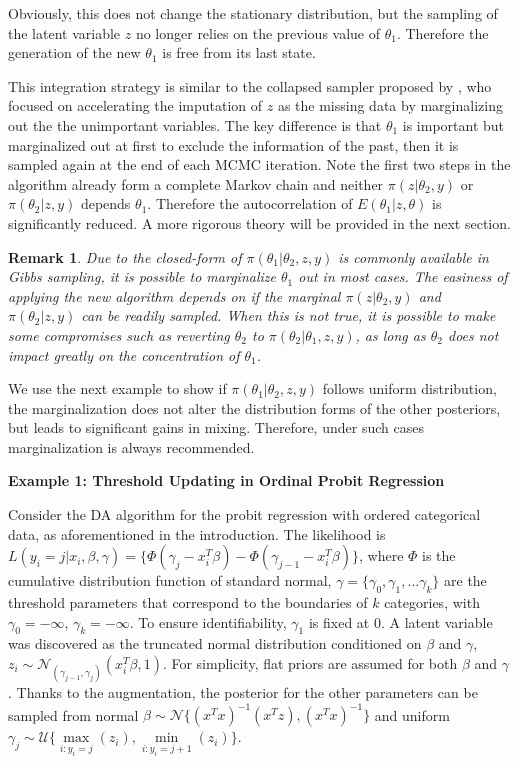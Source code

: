 \documentclass[10pt]{article}
\newtheorem{remark}{Remark}
\begin{document}
Obviously, this does not change the stationary distribution, but the sampling of the latent variable $z$ no longer relies on the previous value of $\theta_1$. Therefore the generation of the new $\theta_1$ is free from its last state.

This integration strategy is similar to the collapsed sampler proposed by \cite{liu1994collapsed},  who focused on accelerating the imputation of $z$ as the missing data by marginalizing out the the unimportant variables. The key difference is that $\theta_1$ is important but marginalized out at first to exclude the information of the past, then it is sampled again at the end of each MCMC iteration. Note the first two steps in the algorithm  already form a complete Markov chain and neither $\pi(z|\theta_2, y)$ or $\pi(\theta_2|z, y)$ depends $\theta_1$. Therefore the autocorrelation of $E(\theta_1|z,\theta)$ is significantly reduced. A more rigorous theory will be provided in the next section.

\begin{remark}
Due to the closed-form of $\pi(\theta_1| \theta_2,z,y)$ is commonly available in Gibbs sampling, it is possible to marginalize $\theta_1$ out in most cases. The easiness of applying the new algorithm depends on if the marginal $\pi(z|\theta_2, y)$ and $\pi(\theta_2|z, y)$ can be readily sampled. When this is not true, it is possible to make some compromises such as reverting $\theta_2$ to $\pi(\theta_2|\theta_1,z, y)$, as long as $\theta_2$ does not impact greatly on the concentration of $\theta_1$.
\end{remark}

We use the next example to show if $\pi(\theta_1| \theta_2,z,y)$  follows uniform distribution, the marginalization does not alter the distribution forms of the other posteriors, but leads to significant gains in mixing. Therefore, under such cases marginalization is always recommended.

{\bf Example 1: Threshold Updating in Ordinal Probit Regression}

Consider the \cite{albert1993bayesian} DA algorithm for the probit regression with ordered categorical data, as aforementioned in the introduction. The likelihood is $L(y_i=j|x_i,\beta,\gamma)= \{  \Phi( \gamma_j- x^T_i\beta) -  \Phi( \gamma_{j-1}- x^T_i\beta)    \}$, where $\Phi$ is the cumulative distribution function of standard normal, $\gamma=\{\gamma_0,\gamma_1,...\gamma_k\}$ are the threshold parameters that correspond to the boundaries of $k$ categories, with $\gamma_0=-\infty$, $\gamma_k=-\infty$. To ensure identifiability, $\gamma_1$ is fixed at $0$. A latent variable was discovered as the truncated normal distribution conditioned on $\beta$ and $\gamma$, $z_i \sim \mathcal N_{(\gamma_{j-1}, \gamma_{j})}(x^T_i\beta,1)$. For simplicity, flat priors are assumed for both $\beta$ and $\gamma$. Thanks to the augmentation, the posterior for the other parameters  can be sampled from  normal $\beta \sim \mathcal{N} \{   (x^Tx)^{-1}(x^Tz),(x^Tx)^{-1} \}$ and uniform $\gamma_j \sim \mathcal{U}\{ \underset{i:y_i=j}{\max}(z_i),  \underset{i:y_i=j+1}{\min} (z_i)  \}$.
\end{document}
